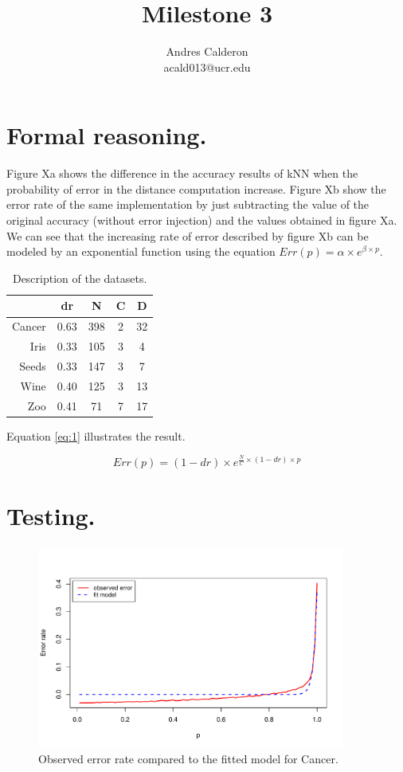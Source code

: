 \documentclass{article}
\title{Milestone 3}
\author{Andres Calderon \\ acald013@ucr.edu}
\begin{document}
\maketitle

\section{Formal reasoning.}
Figure Xa shows the difference in the accuracy results of kNN when the probability of error in the distance computation increase. Figure Xb show the error rate of the same implementation by just subtracting the value of the original accuracy (without error injection) and the values obtained in figure Xa.  We can see that the increasing rate of error described by figure Xb can be modeled by an exponential function using the equation $Err(p) = \alpha \times e^{\beta \times p}$.

 \begin{table}
 \centering
 \begin{tabular}{rcccc}
  \toprule
	& \textbf{dr}	& \textbf{N}	& \textbf{C}	& \textbf{D} 	\\
  \midrule
Cancer	& 0.63	& 398	& 2	& 32 	\\
Iris	& 0.33	& 105	& 3	& 4 	\\
Seeds	& 0.33	& 147	& 3	& 7 	\\
Wine	& 0.40	& 125	& 3	& 13 	\\
Zoo	& 0.41	& 71	& 7	& 17 	\\
  \bottomrule
 \end{tabular}
 \caption{Description of the datasets.}\label{tab:desc}
 \end{table}
 

Equation \ref{eq:1} illustrates the result.

\begin{equation}
  Err(p)=(1-dr) \times e^{\frac{N}{C} \times (1-dr) \times p}
\end{equation}\label{eq:1}


\section{Testing.}

\begin{figure}
 \centering
 \includegraphics[width=0.9\textwidth]{./figures/cancer.pdf}
 \caption{Observed error rate compared to the fitted model for Cancer.}
 \label{fig:cancer}
\end{figure}
\end{document}
